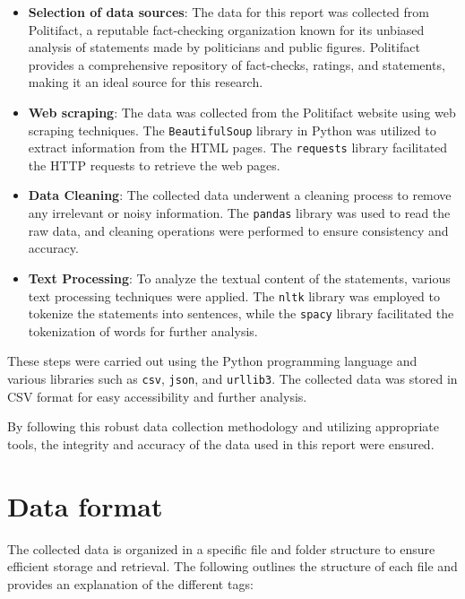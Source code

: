 \documentclass[12pt]{article}
\begin{document}
\begin{itemize}
  \item \textbf{Selection of data sources}: The data for this report was collected from Politifact, a reputable fact-checking organization known for its unbiased analysis of statements made by politicians and public figures. Politifact provides a comprehensive repository of fact-checks, ratings, and statements, making it an ideal source for this research.
  
  \item \textbf{Web scraping}: The data was collected from the Politifact website using web scraping techniques. The \texttt{BeautifulSoup} library in Python was utilized to extract information from the HTML pages. The \texttt{requests} library facilitated the HTTP requests to retrieve the web pages.
  
  \item \textbf{Data Cleaning}: The collected data underwent a cleaning process to remove any irrelevant or noisy information. The \texttt{pandas} library was used to read the raw data, and cleaning operations were performed to ensure consistency and accuracy.
  
  \item \textbf{Text Processing}: To analyze the textual content of the statements, various text processing techniques were applied. The \texttt{nltk} library was employed to tokenize the statements into sentences, while the \texttt{spacy} library facilitated the tokenization of words for further analysis.
\end{itemize}

These steps were carried out using the Python programming language and various libraries such as \texttt{csv}, \texttt{json}, and \texttt{urllib3}. The collected data was stored in CSV format for easy accessibility and further analysis.

By following this robust data collection methodology and utilizing appropriate tools, the integrity and accuracy of the data used in this report were ensured.

\section{Data format}

The collected data is organized in a specific file and folder structure to ensure efficient storage and retrieval. The following outlines the structure of each file and provides an explanation of the different tags:
\end{document}
